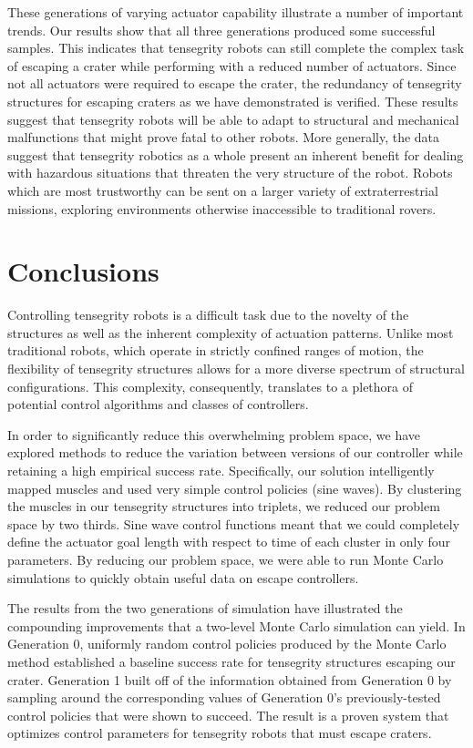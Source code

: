 \documentclass{llncs}
\begin{document}
\label{robustdiscussion} {
These generations of varying actuator capability illustrate a number of important trends.
Our results show that all three generations produced some successful samples.
This indicates that tensegrity robots can still complete the complex task of escaping a crater while performing with a reduced number of actuators.
Since not all actuators were required to escape the crater, the redundancy of tensegrity structures for escaping craters as we have demonstrated is verified.
These results suggest that tensegrity robots will be able to adapt to structural and mechanical malfunctions that might prove fatal to other robots.
More generally, the data suggest that tensegrity robotics as a whole present an inherent benefit for dealing with hazardous situations that threaten the very structure of the robot.
Robots which are most trustworthy can be sent on a larger variety of extraterrestrial missions, exploring environments otherwise inaccessible to traditional rovers.

}
 
\section{Conclusions}
\label{conclusion}
Controlling tensegrity robots is a difficult task due to the novelty of the structures as well as the inherent complexity of actuation patterns.
Unlike most traditional robots, which operate in strictly confined ranges of motion, the flexibility of tensegrity structures allows for a more diverse spectrum of structural configurations.
This complexity, consequently, translates to a plethora of potential control algorithms and classes of controllers.

In order to significantly reduce this overwhelming problem space, we have explored methods to reduce the variation between versions of our controller while retaining a high empirical success rate.
Specifically, our solution intelligently mapped muscles and used very simple control policies (sine waves).
By clustering the muscles in our tensegrity structures into triplets, we reduced our problem space by two thirds.
Sine wave control functions meant that we could completely define the actuator goal length with respect to time of each cluster in only four parameters.
By reducing our problem space, we were able to run Monte Carlo simulations to quickly obtain useful data on escape controllers.

The results from the two generations of simulation have illustrated the compounding improvements that a two-level Monte Carlo simulation can yield.
In Generation 0, uniformly random control policies produced by the Monte Carlo method established a baseline success rate for tensegrity structures escaping our crater.
Generation 1 built off of the information obtained from Generation 0 by sampling around the corresponding values of Generation 0's previously-tested control policies that were shown to succeed.
The result is a proven system that optimizes control parameters for tensegrity robots that must escape craters.
\end{document}
